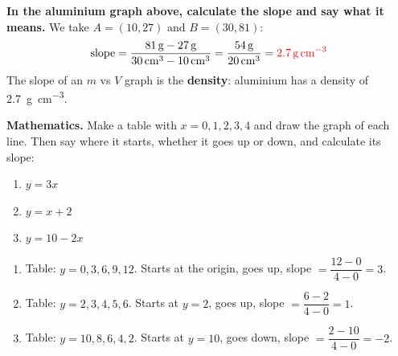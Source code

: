 \begin{example}
    \textbf{In the aluminium graph above, calculate the slope and say what it means.} We take \(A = (10, 27)\) and \(B = (30, 81)\):
    \begin{equation*}
        \text{slope} = \dfrac{\qty{81}{\g} - \qty{27}{\g}}{\qty{30}{\cubic\cm} - \qty{10}{\cubic\cm}} = \dfrac{\qty{54}{\g}}{\qty{20}{\cubic\cm}} = \textcolor{red}{\qty{2.7}{\g\per\cubic\cm}}
    \end{equation*}
    The slope of an \(m\) vs \(V\) graph is the \textbf{density}: aluminium has a density of \qty{2.7}{\g\per\cubic\cm}.
\end{example}

\begin{exercise}
    \textbf{Mathematics.} Make a table with \(x = 0, 1, 2, 3, 4\) and draw the graph of each line. Then say where it starts, whether it goes up or down, and calculate its slope:
    \begin{enumerate}[label=\letraminuscula]
        \item \(y = 3x\)
        \item \(y = x + 2\)
        \item \(y = 10 - 2x\)
    \end{enumerate}
    \begin{solu}
        \begin{enumerate}[label=\alph*)]
            \item Table: \(y = 0, 3, 6, 9, 12\). Starts at the origin, goes up, slope \(= \dfrac{12 - 0}{4 - 0} = 3\).
            \item Table: \(y = 2, 3, 4, 5, 6\). Starts at \(y = 2\), goes up, slope \(= \dfrac{6 - 2}{4 - 0} = 1\).
            \item Table: \(y = 10, 8, 6, 4, 2\). Starts at \(y = 10\), goes down, slope \(= \dfrac{2 - 10}{4 - 0} = -2\).
        \end{enumerate}
    \end{solu}
\end{exercise}

